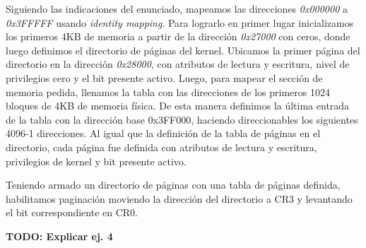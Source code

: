 Siguiendo las indicaciones del enunciado, mapeamos las direcciones \textit{0x000000} a \textit{0x3FFFFF} usando \textit{identity mapping}.
Para lograrlo en primer lugar inicializamos los primeros 4KB de memoria a partir de la dirección \textit{0x27000} con ceros, donde luego definimos el directorio de páginas del kernel.
Ubicamos la primer página del directorio en la dirección \textit{0x28000}, con atributos de lectura y escritura, nivel de privilegios cero y el bit presente activo.
Luego, para mapear el sección de memoria pedida, llenamos la tabla con las direcciones de los primeros 1024 bloques de 4KB de memoria física. 
De esta manera definimos la última entrada de la tabla con la dirección base 0x3FF000, haciendo direccionables los siguientes 4096-1 direcciones. 
Al igual que la definición de la tabla de páginas en el directorio, cada página fue definida con atributos de lectura y escritura, privilegios de kernel y bit presente activo.

Teniendo armado un directorio de páginas con una tabla de páginas definida, habilitamos paginación moviendo la dirección del directorio a CR3 y levantando el bit correspondiente en CR0.
 



\textbf{TODO: Explicar ej. 4}\\
\begin{comment}
a) Escribir una rutina (inicializar mmu) que se encargue de inicializar las estructuras ne-
cesarias para administrar la memoria en el area libre (un contador de paginas libres).


b) Escribir una rutina (mmu inicializar dir tarea) encargada de inicializar un directorio
de páginas y tablas de páginas para una tarea, respetando la figura 3. La rutina debe copiar
el código de la tarea a su área asignada, es decir la posición indicada por el jugador dentro
de el mapa y mapear dichas páginas a partir de la dirección virtual 0x08000000(128MB).
Sugerencia: agregar a esta función todos los parámentros que considere necesarios para los
distintos tipos de tareas.


c) Escribir dos rutinas encargadas de mapear y desmapear páginas de memoria.

I- mmu mapear pagina(unsigned int virtual, unsigned int cr3, unsigned int fisica)
Permite mapear la página fı́sica correspondiente a fisica en la dirección virtual
virtual utilizando cr3.

II- mmu unmapear pagina(unsigned int virtual, unsigned int cr3)
Borra el mapeo creado en la dirección virtual virtual utilizando cr3.
\end{comment}


